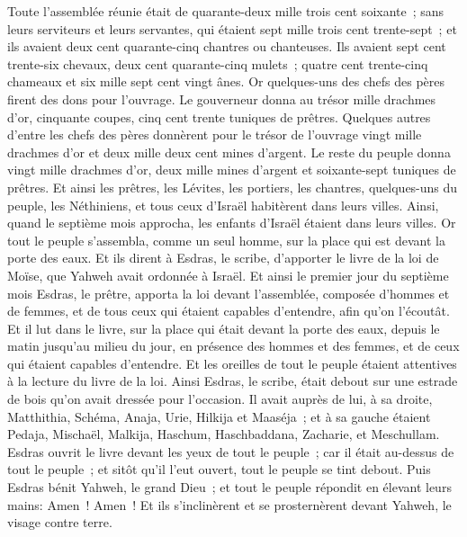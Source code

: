 \begin{multicols}{2}
Toute l'assemblée réunie était de quarante-deux mille trois cent soixante~;
sans leurs serviteurs et leurs servantes, qui étaient sept mille trois cent trente-sept~; et ils avaient deux cent quarante-cinq chantres ou chanteuses.
Ils avaient sept cent trente-six chevaux, deux cent quarante-cinq mulets~;
quatre cent trente-cinq chameaux et six mille sept cent vingt ânes.
Or quelques-uns des chefs des pères firent des dons pour l'ouvrage. Le gouverneur donna au trésor mille drachmes d'or, cinquante coupes, cinq cent trente tuniques de prêtres.
Quelques autres d'entre les chefs des pères donnèrent pour le trésor de l'ouvrage vingt mille drachmes d'or et deux mille deux cent mines d'argent.
Le reste du peuple donna vingt mille drachmes d'or, deux mille mines d'argent et soixante-sept tuniques de prêtres.
Et ainsi les prêtres, les Lévites, les portiers, les chantres, quelques-uns du peuple, les Néthiniens, et tous ceux d'Israël habitèrent dans leurs villes. Ainsi, quand le septième mois approcha, les enfants d'Israël étaient dans leurs villes.
\VerseOne{}Or tout le peuple s'assembla, comme un seul homme, sur la place qui est devant la porte des eaux. Et ils dirent à Esdras, le scribe, d'apporter le livre de la loi de Moïse, que Yahweh avait ordonnée à Israël.
Et ainsi le premier jour du septième mois Esdras, le prêtre, apporta la loi devant l'assemblée, composée d'hommes et de femmes, et de tous ceux qui étaient capables d'entendre, afin qu'on l'écoutât.
Et il lut dans le livre, sur la place qui était devant la porte des eaux, depuis le matin jusqu'au milieu du jour, en présence des hommes et des femmes, et de ceux qui étaient capables d'entendre. Et les oreilles de tout le peuple étaient attentives à la lecture du livre de la loi.
Ainsi Esdras, le scribe, était debout sur une estrade de bois qu'on avait dressée pour l'occasion. Il avait auprès de lui, à sa droite, Matthithia, Schéma, Anaja, Urie, Hilkija et Maaséja~; et à sa gauche étaient Pedaja, Mischaël, Malkija, Haschum, Haschbaddana, Zacharie, et Meschullam.
Esdras ouvrit le livre devant les yeux de tout le peuple~; car il était au-dessus de tout le peuple~; et sitôt qu'il l'eut ouvert, tout le peuple se tint debout.
Puis Esdras bénit Yahweh, le grand Dieu~; et tout le peuple répondit en élevant leurs mains: Amen~! Amen~! Et ils s'inclinèrent et se prosternèrent devant Yahweh, le visage contre terre.

\end{multicols}
